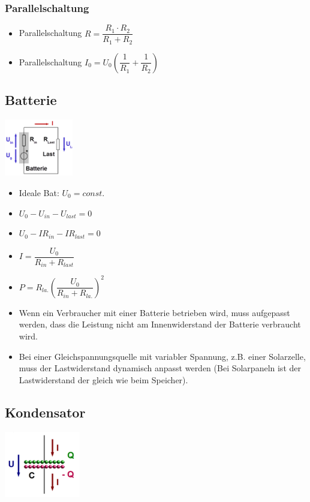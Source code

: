\documentclass[6pt,a4paper]{scrartcl}
\begin{document}
\begin{multicols*}{4}
				\subsubsection{Parallelschaltung}	
					\begin{itemize}\itemsep0pt
						\item Parallelschaltung $R=\dfrac{R_{1} \cdot R_{2}}{R_{1} + R_{2}}$
						\item Parallelschaltung $I_{0}=U_{0}(\dfrac{1}{R_{1}} + \dfrac{1}{R_{2}})$
					\end{itemize}
			
			
		\subsection{Batterie}
			\begin{multicols*}{2}
				\includegraphics[height=2.5cm]{img/batterie.png} \\
				\begin{itemize}\itemsep0pt
					\item Ideale Bat: $U_{0}=const.$				
					\item $U_{0}-U_{in}-U_{last} =0$
					\item $U_{0}-IR_{in}-IR_{last} =0$
					\item $I=\dfrac{U_{0}}{R_{in}+R_{last}}$
					\item $P=R_{la.}(\dfrac{U_{0}}{R_{in}+R_{la.}})^{2}$
				\end{itemize}
			\end{multicols*}
			\begin{itemize}\itemsep0pt
				\item Wenn ein Verbraucher mit einer Batterie betrieben wird, muss aufgepasst werden, dass die Leistung nicht am Innenwiderstand der Batterie verbraucht wird.
				\item Bei einer Gleichspannungsquelle mit variabler Spannung, z.B. einer Solarzelle, muss der Lastwiderstand dynamisch anpasst werden (Bei Solarpaneln ist der Lastwiderstand der gleich wie beim Speicher).			
			\end{itemize}
			
		\subsection{Kondensator}
			\begin{multicols*}{2}
				\includegraphics[height=2.9cm]{img/kondensator1.png} 
				

\end{multicols*}
\end{multicols*}
\end{document}
